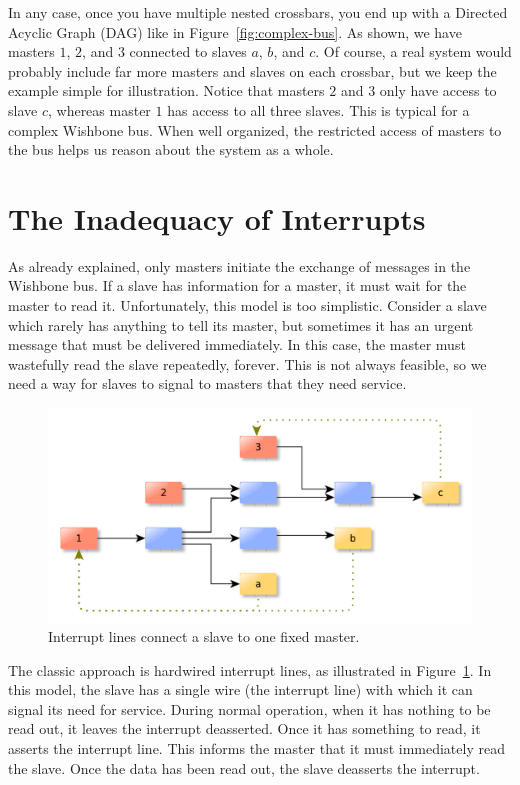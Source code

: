 \documentclass[a4paper]{jacow}
\begin{document}
In any case, once you have multiple nested crossbars, you end up with a
Directed Acyclic Graph (DAG) like in Figure~\ref{fig:complex-bus}.
As shown, we have masters $1$, $2$, and $3$ connected to slaves $a$, $b$, and $c$.
Of course, a real system would probably include far more masters and slaves on each
crossbar, but we keep the example simple for illustration.
Notice that masters $2$ and $3$ only have access to slave $c$,
whereas master $1$ has access to all three slaves.
This is typical for a complex Wishbone bus.
When well organized, the restricted access of masters to the bus helps
us reason about the system as a whole.

\section{The Inadequacy of Interrupts}

As already explained,
only masters initiate the exchange of messages in the Wishbone bus.
If a slave has information for a master, it must wait for the master to read it.
Unfortunately, this model is too simplistic.
Consider a slave which rarely has anything to tell its master,
but sometimes it has an urgent message that must be delivered immediately.
In this case, the master must wastefully read the slave repeatedly, forever.
This is not always feasible, so we need a way for slaves to signal to
masters that they need service.

\begin{figure}[t]
  \centering
 \includegraphics*[width=\columnwidth]{bad-irq}
  \caption{Interrupt lines connect a slave to one fixed master.}
  \label{fig:bad-irq}
\end{figure}

The classic approach is hardwired interrupt lines,
as illustrated in Figure~\ref{fig:bad-irq}.
In this model, the slave has a single wire (the interrupt line) with which
it can signal its need for service.
During normal operation, when it has nothing to be read out,
it leaves the interrupt deasserted.
Once it has something to read, it asserts the interrupt line.
This informs the master that it must immediately read the slave.
Once the data has been read out, the slave deasserts the interrupt.
\end{document}
